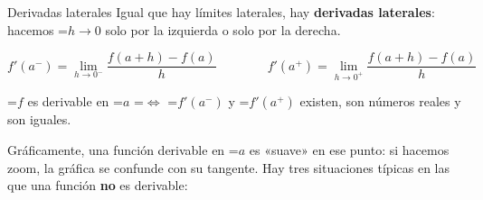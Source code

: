 \documentclass[11pt,a4paper]{article}
\newcommand{\fmm}[1]{\setbox0=\hbox{$#1$}\ifdim\wd0>\linewidth\[#1\]\else\mbox{\box0}\fi}
\begin{document}
  
\begin{fmdef}{Derivadas laterales}
Igual que hay límites laterales, hay \textbf{derivadas laterales}: hacemos \fmm{h\to0} solo por la izquierda o solo por la derecha.

      
\[f'(a^-)=\lim_{h\to0^-}\frac{f(a+h)-f(a)}{h}\qquad\qquad f'(a^+)=\lim_{h\to0^+}\frac{f(a+h)-f(a)}{h}\]

      
\begin{center}\colorbox{fmyellow!45}{\parbox{0.9\linewidth}{\centering\strut \fmm{f} es derivable en \fmm{a} \fmm{\iff} \fmm{f'(a^-)} y \fmm{f'(a^+)} existen, son números reales y son iguales.\strut}}\end{center}

      

Gráficamente, una función derivable en \fmm{a} es «suave» en ese punto: si hacemos zoom, la gráfica se confunde con su tangente. Hay tres situaciones típicas en las que una función \textbf{no} es derivable:


\end{fmdef}
\end{document}
